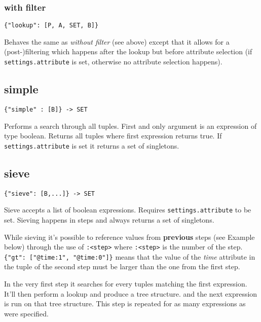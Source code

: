 \documentclass[12pt]{article}
\begin{document}
\subsubsection{with filter}

\begin{verbatim}
{"lookup": [P, A, SET, B]}
\end{verbatim}

Behaves the same as \textit{without filter} (see above) except that it allows for a (post-)filtering which happens after the lookup but before attribute selection (if \verb|settings.attribute| is set, otherwise
no attribute selection happens).


\subsection{simple}

\begin{verbatim}
{"simple" : [B]} -> SET
\end{verbatim}

Performs a search through all tuples. First and only argument is an expression of type boolean. Returns all tuples where first expression
returns true. If \verb|settings.attribute| is set it returns a set of singletons.

\subsection{sieve}

\begin{verbatim}
{"sieve": [B,...]} -> SET
\end{verbatim}

Sieve accepts a list of boolean expressions. Requires \verb|settings.attribute| to be set. Sieving happens in steps and always returns a set of singletons.

While sieving it's possible to reference values from \textbf{previous} steps (see Example below) through the use of \verb|:<step>| where \verb|:<step>| is the number of the step.
\verb|{"gt": ["@time:1", "@time:0"]}| means that the value of the \textit{time} attribute in the tuple of the second step must be larger than the one from the first step.

In the very first step it searches for every tuples matching the first expression. It'll then perform a lookup and produce a tree structure. 
and the next expression is run on that tree structure. This step is repeated for as many expressions as were specified. \\
\end{document}
